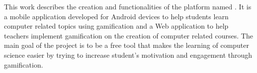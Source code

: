 This work describes the creation and functionalities of the platform named \appName. It is a mobile application developed for Android devices to help students learn computer related topics using gamification and a Web application to help teachers implement gamification on the creation of computer related courses. The main goal of the project is to be a free tool that makes the learning of computer science easier by trying to increase student's motivation and engagement through gamification.